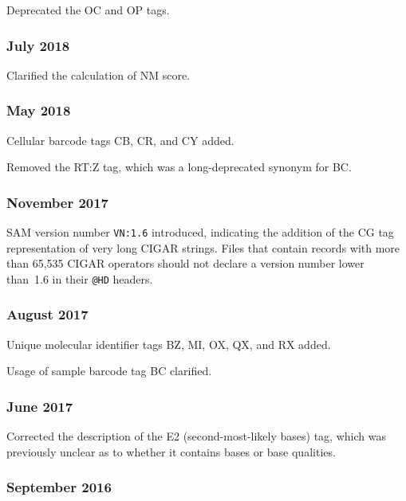 \documentclass[10pt]{article}
\begin{document}
\begin{appendices}
Deprecated the OC and OP tags.

\subsubsection*{July 2018}

Clarified the calculation of NM score.

\subsubsection*{May 2018}

Cellular barcode tags CB, CR, and CY added.

Removed the RT:Z tag, which was a long-deprecated synonym for BC.

\subsubsection*{November 2017}

SAM version number {\tt VN:1.6} introduced, indicating the addition of the CG tag representation of very long CIGAR strings.
Files that contain records with more than 65,535 CIGAR operators should not declare a version number lower than~1.6 in their {\tt @HD} headers.

\subsubsection*{August 2017}

Unique molecular identifier tags BZ, MI, OX, QX, and RX added.

Usage of sample barcode tag BC clarified.

\subsubsection*{June 2017}

Corrected the description of the E2 (second-most-likely bases) tag, which was previously unclear as to whether it contains bases or base qualities.

\subsubsection*{September 2016}


\end{appendices}
\end{document}
